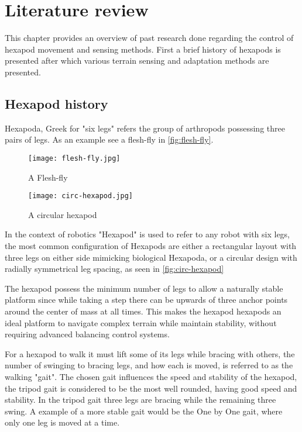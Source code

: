 \chapter{Literature review}
This chapter provides an overview of past research done regarding the control of hexapod movement and sensing methods. First a brief history of hexapods is presented after which various terrain sensing and adaptation methods are presented.

\section{Hexapod history}
Hexapoda, Greek for "six legs" refers the group of arthropods possessing three pairs of legs. As an example see a flesh-fly in \autoref{fig:flesh-fly}.

\begin{figure}[h]
    \centering
    \begin{minipage}{.5\textwidth}
        \centering
        \texttt{[image: flesh-fly.jpg]}
        \caption{A Flesh-fly}
        \label{fig:flesh-fly}
    \end{minipage}%
    \begin{minipage}{.5\textwidth}
        \centering
        \texttt{[image: circ-hexapod.jpg]}
        \caption{A circular hexapod}
        \label{fig:circ-hexapod}  
    \end{minipage}
\end{figure}

In the context of robotics "Hexapod" is used to refer to any robot with six legs, the most common configuration of Hexapods are either a rectangular
layout with three legs on either side mimicking biological Hexapoda, or a circular design with radially symmetrical leg spacing, as seen in \autoref{fig:circ-hexapod}

The hexapod possess the minimum number of legs to allow a naturally stable platform since while taking a step there can be upwards of three anchor points around the center of mass at all times. This makes the hexapod hexapods an ideal platform to navigate complex terrain while maintain stability, without requiring advanced balancing control systems.

For a hexapod to walk it must lift some of its legs while bracing with others, the number of swinging to bracing legs, and how each is moved, is referred to as the walking "gait". The chosen gait influences the speed and stability of the hexapod, the tripod gait is considered to be the most well rounded, having good speed and stability. In the tripod gait three legs are bracing while the remaining three swing. A example of a more stable gait would be the One by One gait, where only one leg is moved at a time.

